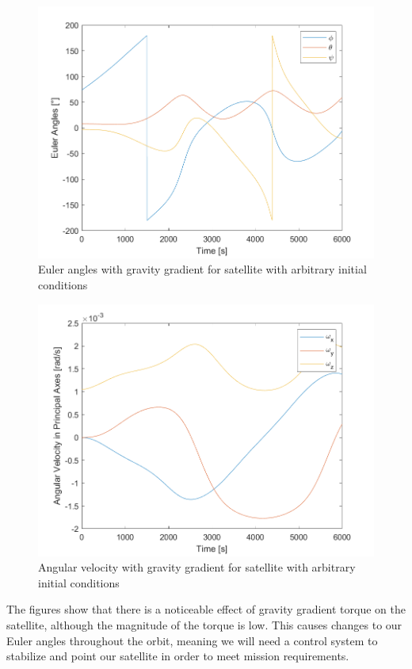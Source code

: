 \begin{figure}[H]
\centering
\includegraphics[scale=0.8]{Images/ps4_problem4e_angle.png}
\caption{Euler angles with gravity gradient for satellite with arbitrary initial conditions}
\label{fig:ps4_problem4e_angle}
\end{figure}

\begin{figure}[H]
\centering
\includegraphics[scale=0.8]{Images/ps4_problem4e_angvel.png}
\caption{Angular velocity with gravity gradient for satellite with arbitrary initial conditions}
\label{fig:ps4_problem4e_angvel}
\end{figure}

The figures show that there is a noticeable effect of gravity gradient torque on the satellite, although the magnitude of the torque is low. This causes changes to our Euler angles throughout the orbit, meaning we will need a control system to stabilize and point our satellite in order to meet mission requirements.

